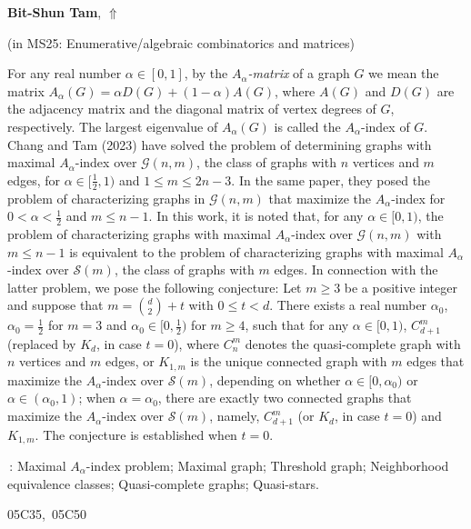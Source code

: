 \documentclass[ILAS2025-program.tex]{subfiles}
\begin{document}
     \hypertarget{down0227}{}\begin{ilasabstract}
    
    \textbf{Bit-Shun Tam},  \hfill \hyperlink{up0227}{$\Uparrow$}
    
    (in {\color{mstitle}MS25: Enumerative/algebraic combinatorics and matrices})
        
        \mtskip
    \noindent  For any real number $\alpha\in [0,1]$, by the {\it
$A_\alpha$-matrix} of a graph $G$ we mean the matrix
$A_{\alpha}(G)=\alpha D(G)+(1-\alpha)A(G)$, where $A(G)$ and $D(G)$
are the adjacency matrix and the diagonal matrix of vertex degrees
of $G$, respectively. The largest eigenvalue of $A_{\alpha}(G)$ is
called the $A_\alpha$-index of $G$. Chang and Tam (2023) have solved
the problem of determining graphs with maximal $A_{\alpha}$-index
over $\mathcal{G}(n,m)$, the class of graphs with $n$ vertices and
$m$ edges, for $\alpha \in [\frac{1}{2},1)$ and $1\le m\le 2n-3$. In
the same paper, they posed the problem of characterizing graphs in
$\mathcal{G}(n,m)$ that maximize the $A_{\alpha}$-index for $0<
\alpha < \frac{1}{2}$ and $m\le n-1$. In this work, it is noted
that, for any $\alpha\in [0,1)$, the problem of characterizing
graphs with maximal $A_{\alpha}$-index over $\mathcal{G}(n,m)$ with
$m\le n-1$ is equivalent to the problem of characterizing graphs
with maximal $A_{\alpha}$-index over $\mathscr{S}(m)$, the class of
graphs with $m$ edges. In connection with the latter problem, we
pose the following conjecture: Let $m\ge 3$ be a positive integer
and suppose that $m={\binom{d}{2}}+t$ with $0\le t < d$. There exists
a real number $\alpha_0$, $\alpha_0=\frac{1}{2}$ for $m=3$ and
$\alpha_0\in [0,\frac{1}{2})$ for $m\ge 4$, such that for any
$\alpha \in [0,1)$, $C^m_{d+1}$ (replaced by $K_d$, in case $t=0$),
where $C^m_n$ denotes the quasi-complete graph with $n$ vertices and
$m$ edges, or $K_{1,m}$ is the unique connected graph with $m$ edges
that maximize the $A_{\alpha}$-index over $\mathscr{S}(m)$,
depending on whether $\alpha\in [0,\alpha_0)$ or $\alpha\in
(\alpha_0,1)$; when $\alpha = \alpha_0$, there are exactly two
connected graphs that maximize the $A_{\alpha}$-index over
$\mathscr{S}(m)$, namely, $C^m_{d+1}$ (or $K_d$, in case $t=0$) and
$K_{1,m}$. The conjecture is established when $t=0$.

\vspace{2mm} \,: Maximal $A_{\alpha}$-index
problem; Maximal graph; Threshold graph; Neighborhood equivalence
classes; Quasi-complete graphs; Quasi-stars.
 \vspace{2mm}

 05C35,\ 05C50\end{ilasabstract}
\end{document}
